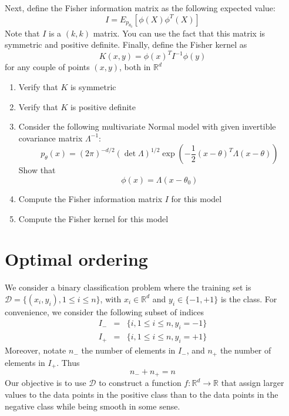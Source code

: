 \documentclass{article}[12pt]
\begin{document}
Next, define the Fisher information matrix as the following expected value:
\begin{equation}
I = E_{p_{\theta_0}}[\phi(X)\phi^T(X)]
\end{equation}
Note that $I$ is a $(k,k)$ matrix. You can use the fact that this matrix is symmetric and positive definite. 
Finally, define the Fisher kernel as 
\begin{equation}
K(x,y)=\phi(x)^T I^{-1} \phi(y)
\end{equation}
for any couple of points $(x,y)$, both in $\mathbb{R}^d$
\begin{enumerate}  
\item Verify that $K$ is symmetric
\newpage
\item Verify that $K$ is positive definite
\newpage
\item
Consider the following multivariate Normal model with given invertible covariance matrix $\Lambda^{-1}$: 
\begin{equation}
p_\theta(x)=(2\pi)^{-d/2}(\det{\Lambda})^{1/2}\exp\left(-\frac{1}{2}(x-\theta)^T\Lambda (x-\theta)\right)
\end{equation}
Show that 
\begin{equation}
\phi(x)=\Lambda (x - \theta_0)
\end{equation}
\newpage
\item Compute the Fisher information matrix $I$ for this model
\newpage
\item Compute the Fisher kernel for this model
\newpage
\end{enumerate}
\section{Optimal ordering}
We consider a binary classification problem where the training set is $\mathcal{D}=\{(x_i,y_i), 1\leq i \leq n\}$, with $x_i \in \mathbb{R}^d$ and $y_i \in \{-1,+1\}$ is the class. For convenience, we consider the following subset of indices 
\begin{eqnarray}
I_-&=&\{i, 1\leq i \leq n, y_i=-1\}\\
I_+&=& \{i, 1\leq i \leq n, y_i=+1\}
\end{eqnarray}
Moreover, notate $n_-$ the number of elements in $I_-$, and $n_+$ the number of elements in $I_+$. Thus 
\begin{equation}
n_-+n_+=n
\end{equation}
 Our objective is to use $\mathcal{D}$ to construct a function $f:\mathbb{R}^d \to \mathbb{R}$ that assign larger values to the data points in the positive class than to the data points in the negative class while being smooth in some sense. 
\end{document}

